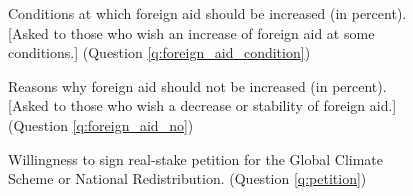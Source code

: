 \documentclass[12pt,english]{article}
\begin{document}
\begin{figure}[h!]
    \caption[Conditions at which foreign aid should be increased]{Conditions at which foreign aid should be increased (in percent). [Asked to those who wish an increase of foreign aid at some conditions.] (Question \ref{q:foreign_aid_condition})}\label{fig:foreign_aid_condition}
\end{figure}

\begin{figure}[h!]
    \caption[Reasons why foreign aid should not be increased]{Reasons why foreign aid should not be increased (in percent). [Asked to those who wish a decrease or stability of foreign aid.] (Question \ref{q:foreign_aid_no})}\label{fig:foreign_aid_no}
\end{figure}

\begin{figure}[h!]
    \caption[Willingness to sign a real-stake petition]{Willingness to sign real-stake petition for the Global Climate Scheme or National Redistribution. (Question \ref{q:petition})}\label{fig:petition}
\end{figure}
\end{document}
